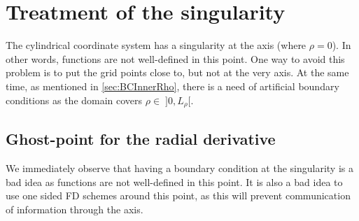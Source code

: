 \section{Treatment of the singularity}
\label{sec:innerCenter}
The cylindrical coordinate system has a singularity at the axis (where $\rho=0$).
In other words, functions are not well-defined in this point.
One way to avoid this problem is to put the grid points close to, but not at the very axis.
At the same time, as mentioned in \cref{sec:BCInnerRho}, there is a need of artificial boundary conditions as the domain covers $\rho \in \;]0, L_\rho[$.

\subsection{Ghost-point for the radial derivative}
\label{sec:ghostRhoDeriv}
We immediately observe that having a boundary condition at the singularity is a bad idea as functions are not well-defined in this point.
It is also a bad idea to use one sided FD schemes around this point, as this will prevent communication of information through the axis.


